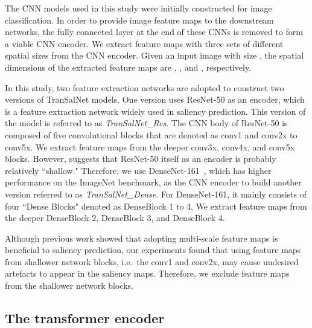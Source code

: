 \documentclass{article}
\begin{document}
The CNN models used in this study were initially constructed for image classification. In order to provide image feature maps to the downstream networks, the fully connected layer at the end of these CNNs is removed to form a viable CNN encoder. We extract feature maps with three sets of different spatial sizes from the CNN encoder. Given an input image with size , the spatial dimensions of the extracted feature maps are , , and , respectively.

In this study, two feature extraction networks are adopted to construct two versions of TranSalNet models. One version uses ResNet-50 \cite{RESNET} as an encoder, which is a feature extraction network widely used in saliency prediction. This version of the model is referred to as \textit{TranSalNet\_Res}. The CNN body of ResNet-50 is composed of five convolutional blocks that are denoted as conv1 and conv2x to conv5x. We extract feature maps from the deeper conv3x, conv4x, and conv5x blocks. However, \cite{EML-NET} suggests that ResNet-50 itself as an encoder is probably relatively ``shallow." Therefore, we use DenseNet-161~\cite{DenseNet}, which has higher performance on the ImageNet benchmark, as the CNN encoder to build another version referred to as \textit{TranSalNet\_Dense}. For DenseNet-161, it mainly consists of four ``Dense Blocks"  denoted as DenseBlock 1 to 4. We extract feature maps from the deeper DenseBlock 2, DenseBlock 3, and DenseBlock 4.


Although previous work \cite{Huang_2015, ML-Net, DVA_Wang, MSI-Net, GAZEGAN} showed that adopting multi-scale feature maps is beneficial to saliency prediction, our experiments found that using feature maps from shallower network blocks, i.e.\ the conv1 and conv2x, may cause undesired artefacts to appear in the saliency maps. Therefore, we exclude feature maps from the shallower network blocks.

\subsection{The transformer encoder}
\end{document}
